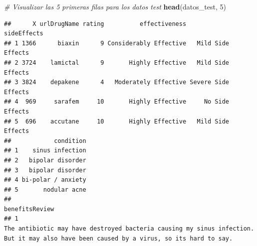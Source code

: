 \documentclass[spanish,]{article}
\newenvironment{Shaded}{\begin{snugshade}}{\end{snugshade}}
\newcommand{\KeywordTok}[1]{\textcolor[rgb]{0.13,0.29,0.53}{\textbf{#1}}}
\newcommand{\DecValTok}[1]{\textcolor[rgb]{0.00,0.00,0.81}{#1}}
\newcommand{\CommentTok}[1]{\textcolor[rgb]{0.56,0.35,0.01}{\textit{#1}}}
\newcommand{\NormalTok}[1]{#1}
\begin{document}
\begin{Shaded}
\begin{Highlighting}[]
\CommentTok{# Visualizar las 5 primeras filas para los datos test}
\KeywordTok{head}\NormalTok{(datos_test, }\DecValTok{5}\NormalTok{) }
\end{Highlighting}
\end{Shaded}

\begin{verbatim}
##      X urlDrugName rating          effectiveness         sideEffects
## 1 1366      biaxin      9 Considerably Effective   Mild Side Effects
## 2 3724    lamictal      9       Highly Effective   Mild Side Effects
## 3 3824    depakene      4   Moderately Effective Severe Side Effects
## 4  969     sarafem     10       Highly Effective     No Side Effects
## 5  696    accutane     10       Highly Effective   Mild Side Effects
##            condition
## 1    sinus infection
## 2   bipolar disorder
## 3   bipolar disorder
## 4 bi-polar / anxiety
## 5       nodular acne
##                                                                                                                                                                                                                                                                                                                                                                                                                                                                                                                                                                                                                                                                                                                                                                                                                                                                                                                                        benefitsReview
## 1                                                                                                                                                                                                                                                                                                                                                                                                                                                                                                                                                                                                                                                                                                                                                                                                            The antibiotic may have destroyed bacteria causing my sinus infection.  But it may also have been caused by a virus, so its hard to say.

\end{verbatim}
\end{document}
